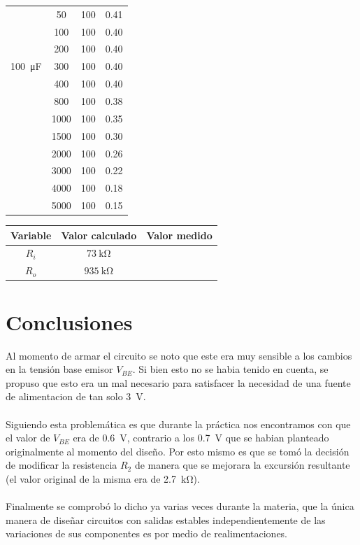 \documentclass[a4paper,12pt]{article}
\newcommand{\mR}[1]{\SI{#1}{\kilo\ohm}}
\newcommand{\mV}[1]{\SI{#1}{\volt}}
\begin{document}
\begin{table}[h]
\begin{tabular}{|c|c|c|c|}
                                & 50   & 100 & 0.41 \\ \cline{2-4}
                                & 100  & 100 & 0.40  \\ \cline{2-4}
                                & 200  & 100 & 0.40  \\ \cline{2-4}
        \SI{100}{\micro F}      & 300  & 100 & 0.40  \\ \cline{2-4}
                                & 400  & 100 & 0.40   \\ \cline{2-4}
                                & 800  & 100 & 0.38  \\ \cline{2-4}
                                & 1000 & 100 & 0.35  \\ \cline{2-4}
                                & 1500 & 100 & 0.30  \\ \cline{2-4}
                                & 2000 & 100 & 0.26  \\ \cline{2-4}
                                & 3000 & 100 & 0.22  \\ \cline{2-4}
                                & 4000 & 100 & 0.18  \\ \cline{2-4}
                                & 5000 & 100 & 0.15  \\ \hline
    \end{tabular}
\end{table}
\begin{table}[h]
    \centering
    \begin{tabular}{|c|c|c|}
        \hline
        Variable    & Valor calculado   & Valor medido      \\ \hline
        $R_i$       & $\mR{73}$         &                   \\ \hline
        $R_o$       & $\mR{935}$        &                   \\ \hline
    \end{tabular}
\end{table}


\newpage
\section{Conclusiones}
    Al momento de armar el circuito se noto que este era muy sensible a los cambios en la tensión base emisor $V_{BE}$. 
    Si bien esto no se habia tenido en cuenta, se propuso que esto era un mal necesario para satisfacer la necesidad de una fuente
    de alimentacion de tan solo \mV{3}. 
    \\ \\
    Siguiendo esta problemática es que durante la práctica nos encontramos con que el valor de $V_{BE}$ era de \mV{0.6}, contrario a los
    \mV{0.7} que se habian planteado originalmente al momento del diseño. Por esto mismo es que se tomó la decisión de modificar la
    resistencia $R_2$ de manera que se mejorara la excursión resultante (el valor original de la misma era de \mR{2.7}).
    \\ \\
    Finalmente se comprobó lo dicho ya varias veces durante la materia, que la única manera de diseñar circuitos con salidas estables
    independientemente de las variaciones de sus componentes es por medio de realimentaciones.
\end{document}
